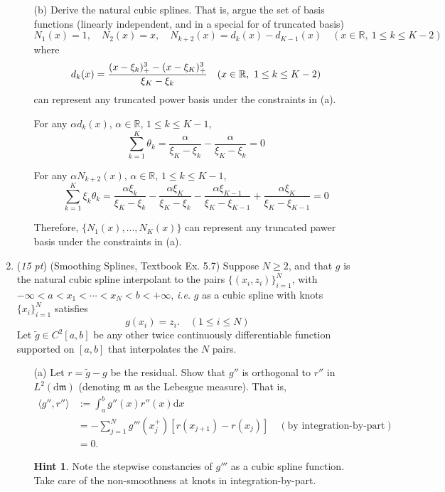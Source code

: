 \documentclass[10pt]{article}
\theoremstyle{definition}
\newtheorem*{hint}{Hint}
\theoremstyle{remark}
\newcommand{\bbR}{\mathbb{R}}
\newcommand{\fm}{\mathfrak{m}}
\newcommand{\rd}{\mathrm{d}}		%
\begin{document}
\begin{enumerate}
\begin{itemize}
		\item [(b)] Derive the natural cubic splines. That is, argue the set of basis functions (linearly independent, and in a special for of truncated basis)
		\[ N_{1}(x) = 1, \quad N_{2}(x) = x, \quad N_{k+2}(x) = d_{k}(x) - d_{K-1}(x) \quad(x \in \bbR,\ 1 \le k \le K-2) \]
		where
		\[ d_{k}(x) = {(x - \xi_{k})_{+}^{3} - (x - \xi_{K})^{3}_{+} \over \xi_{K} - \xi_{k}} \quad(x \in \bbR,\ 1 \le k \le K-2) \]
		can represent any truncated power basis under the constraints in (a).
		
		For any $\alpha d_k(x)$, $\alpha \in \bbR$, $1\le k \le K-1$, \[\sum_{k=1}^K \theta_k = \frac{\alpha}{\xi_K-\xi_k} - \frac{\alpha}{\xi_K-\xi_k} = 0\]
		
		For any $\alpha N_{k+2}(x)$, $\alpha \in \bbR$, $1\le k \le K-1$, \[ \sum_{k=1}^{K}\xi_{k}\theta_{k} = \frac{\alpha\xi_k}{\xi_K-\xi_k} - \frac{\alpha\xi_K}{\xi_K-\xi_k} - \frac{\alpha\xi_{K-1}}{\xi_K-\xi_{K-1}} + \frac{\alpha\xi_{K}}{\xi_K-\xi_{K-1}} =0 \]
		
		Therefore, $\{N_1(x), ..., N_K(x)\}$ can represent any truncated pawer basis under the constraints in (a).
		
	\end{itemize}

	\item (\textit{15 pt}) (Smoothing Splines, Textbook Ex. 5.7) Suppose $ N \ge 2 $, and that $ g $ is the natural cubic spline interpolant to the pairs $ \{ (x_{i},z_{i}) \}_{i=1}^{N} $, with $ -\infty < a < x_{1} < \cdots < x_{N} < b < +\infty $, \textit{i.e.} $ g $ as a cubic spline with knots $ \{ x_{i} \}_{i=1}^{N} $ satisfies
	\[ g(x_{i}) = z_{i}. \quad(1 \le i \le N) \]
	Let $ \widetilde{g} \in C^{2}[a,b] $ be any other twice continuously differentiable function supported on $ [a,b] $ that interpolates the $ N $ pairs.
	
	\begin{itemize}
		\item [(a)] Let $ r = \widetilde{g} - g $ be the residual. Show that $ g'' $ is orthogonal to $ r'' $ in $ L^{2}(\rd \fm) $ (denoting $ \fm $ as the Lebesgue measure). That is,
		\begin{align*}
		\langle g'',r'' \rangle &:= \int_{a}^{b}g''(x)r''(x)\rd x\\
		&= - \sum_{j=1}^{N}g'''(x_{j}^{+})[r(x_{j+1}) - r(x_{j})] \quad(\text{by integration-by-part})\\
		&= 0.
		\end{align*}
		\begin{hint}
			Note the stepwise constancies of $ g''' $ as a cubic spline function. Take care of the non-smoothness at knots in integration-by-part.
		\end{hint}
		

\end{itemize}
\end{enumerate}
\end{document}
